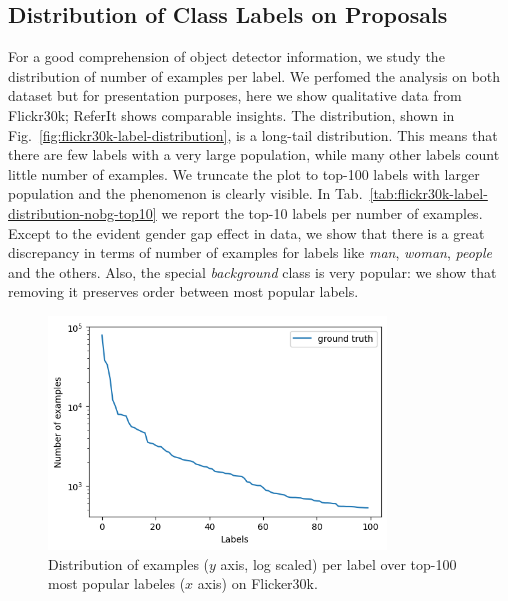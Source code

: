 \subsection{Distribution of Class Labels on Proposals}

For a good comprehension of object detector information, we study the
distribution of number of examples per label. We perfomed the analysis
on both dataset but for presentation purposes, here we show
qualitative data from Flickr30k; ReferIt shows comparable insights.
The distribution, shown in
Fig.~\ref{fig:flickr30k-label-distribution}, is a long-tail
distribution. This means that there are few labels with a very large
population, while many other labels count little number of examples.
We truncate the plot to top-100 labels with larger population and the
phenomenon is clearly visible. In
Tab.~\ref{tab:flickr30k-label-distribution-nobg-top10} we report the
top-10 labels per number of examples. Except to the evident gender gap
effect in data, we show that there is a great discrepancy in terms of
number of examples for labels like \textit{man}, \textit{woman},
\textit{people} and the others. Also, the special \textit{background}
class is very popular: we show that removing it preserves order
between most popular labels.

\begin{figure}
  \includegraphics[width=0.8\textwidth]{figures/number-of-examples-per-label-over-top-100-most-popular-labels.png}
  \caption[Number of examples per label over top-100 most popular labels on Flicker30k]{Distribution of examples ($y$ axis, log scaled) per label over top-100 most popular labeles ($x$ axis) on Flicker30k.}
  \label{tab:flickr30k-label-distribution-top10}
\end{figure}


